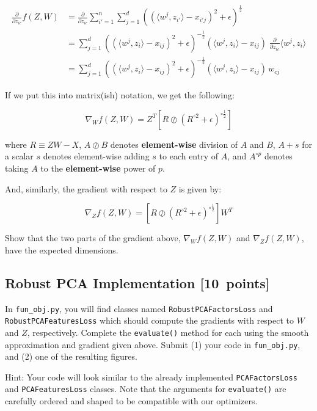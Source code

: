 \documentclass{article}
\newcommand{\blu}[1]{{\textcolor{blu}{#1}}}
\let\ask\blu
\newcommand\pts[1]{\textcolor{pointscolour}{[#1~points]}}
\begin{document}
\begin{align*}
\frac{\partial}{\partial z_{ic}} f(Z,W)
  &= \frac{\partial}{\partial z_{ic}} \sum_{i'=1}^n \sum_{j=1}^d  \left( (\langle w^j, z_{i'}\rangle - x_{i'j})^2 + \epsilon \right)^{\frac12}\\
  &= \sum_{j=1}^d  \left( (\langle w^j, z_{i}\rangle - x_{ij})^2 + \epsilon \right)^{-\frac12}   (\langle w^j, z_{i}\rangle - x_{ij}) \; \frac{\partial}{\partial z_{ic}} \langle w^j, z_i\rangle \\
  &= \sum_{j=1}^d  \left( (\langle w^j, z_i\rangle - x_{ij})^2 + \epsilon \right)^{-\frac12}  (\langle w^j, z_i\rangle - x_{ij}) \, w_{cj}
\end{align*}

If we put this into matrix(ish) notation, we get the following:

\[
\nabla_W f(Z,W) = Z^T \left[ R \oslash \left(R^{\circ 2} + \epsilon\right)^{\circ \frac12}  \right]
\]

where $R\equiv ZW-X$,
$A \oslash B$ denotes \textbf{element-wise} division of $A$ and $B$,
$A + s$ for a scalar $s$ denotes element-wise adding $s$ to each entry of $A$,
and $A^{\circ p}$ denotes taking $A$ to the \textbf{element-wise} power of $p$.

And, similarly, the gradient with respect to $Z$ is given by:

\[
\nabla_Z f(Z,W) = \left[ R \oslash \left(R^{\circ 2} + \epsilon\right)^{\circ \frac12} \right] W^T
\]

\ask{Show that the two parts of the gradient above, $\nabla_W f(Z,W)$ and $\nabla_Z f(Z,W)$, have the expected dimensions.}


\subsection{Robust PCA Implementation \pts{10}}

In \texttt{fun\_obj.py}, you will find classes named \texttt{RobustPCAFactorsLoss} and \texttt{RobustPCAFeaturesLoss} which should compute the gradients with respect to $W$ and $Z$, respectively. \ask{Complete the \texttt{evaluate()} method for each using the smooth approximation and gradient given above. Submit (1) your code in \texttt{fun\_obj.py}, and (2) one of the resulting figures.}

Hint: Your code will look similar to the already implemented \texttt{PCAFactorsLoss} and \texttt{PCAFeaturesLoss} classes. Note that the arguments for \texttt{evaluate()} are carefully ordered and shaped to be compatible with our optimizers.
\end{document}
